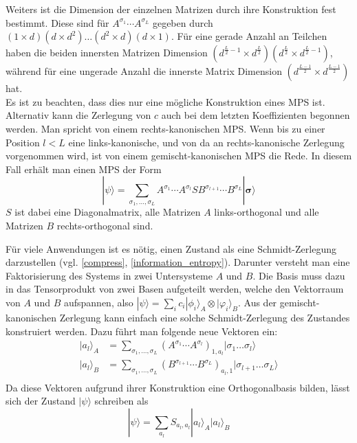 \documentclass[10pt,a4paper]{report}
\newcommand{\SumIndex}{\sigma_1,\ldots,\sigma_L}
\begin{document}
Weiters ist die Dimension der einzelnen Matrizen durch ihre Konstruktion fest bestimmt. Diese sind für $A^{\sigma_1}\cdots A^{\sigma_L}$ gegeben durch $(1\times d)(d\times d^2)\ldots(d^2\times d)(d\times 1)$. Für eine gerade Anzahl an Teilchen haben die beiden innersten Matrizen Dimension $(d^{\frac{L}{2}-1}\times d^{\frac{L}{2}})(d^{\frac{L}{2}}\times d^{\frac{L}{2}-1})$, während für eine ungerade Anzahl die innerste Matrix Dimension $(d^{\frac{L-1}{2}}\times d^{\frac{L-1}{2}})$ hat.\\

Es ist zu beachten, dass dies nur eine mögliche Konstruktion eines MPS ist. Alternativ kann die Zerlegung von $c$ auch bei dem letzten Koeffizienten begonnen werden. Man spricht von einem rechts-kanonischen MPS. Wenn bis zu einer Position $l<L$ eine links-kanonische, und von da an rechts-kanonische Zerlegung vorgenommen wird, ist von einem gemischt-kanonischen MPS die Rede. In diesem Fall erhält man einen MPS der Form
\begin{equation}
|\psi\rangle=\sum_{\SumIndex}A^{\sigma_1}\cdots A^{\sigma_l}S B^{\sigma_{l+1}}\cdots B^{\sigma_L}|\bm{\sigma}\rangle
\end{equation}
$S$ ist dabei eine Diagonalmatrix, alle Matrizen $A$ links-orthogonal und alle Matrizen $B$ rechts-orthogonal sind.

Für viele Anwendungen ist es nötig, einen Zustand als eine Schmidt-Zerlegung darzustellen (vgl. \ref{compress}, \ref{information_entropy}). Darunter versteht man eine Faktorisierung des Systems in zwei Untersysteme $A$ und $B$. Die Basis muss dazu in das Tensorprodukt  von zwei Basen aufgeteilt werden, welche den Vektorraum von $A$ und $B$ aufspannen, also $|\psi\rangle=\sum_i c_i|\phi_i\rangle_A\otimes|\varphi_i\rangle_B$. Aus der gemischt-kanonischen Zerlegung kann einfach eine solche Schmidt-Zerlegung des Zustandes konstruiert werden. Dazu führt man folgende neue Vektoren ein:
\begin{equation}
\begin{split}
|a_l\rangle_A&=\sum_{\SumIndex}\left( A^{\sigma_1}\cdots A^{\sigma_l}\right)_{1,a_l}|\sigma_1\ldots\sigma_l\rangle \\
|a_l\rangle_B&=\sum_{\SumIndex}\left(B^{\sigma_{l+1}}\cdots B^{\sigma_L}\right)_{a_l,1}|\sigma_{l+1}\ldots\sigma_L\rangle\\
\end{split}
\end{equation}
Da diese Vektoren aufgrund ihrer Konstruktion eine Orthogonalbasis bilden, lässt sich der Zustand $|\psi\rangle$ schreiben als
\begin{equation}\label{MPS_Schmidt_equ}
|\psi\rangle=\sum_{a_l}S_{a_l,a_l}|a_l\rangle_A|a_l\rangle_B
\end{equation}
\end{document}
